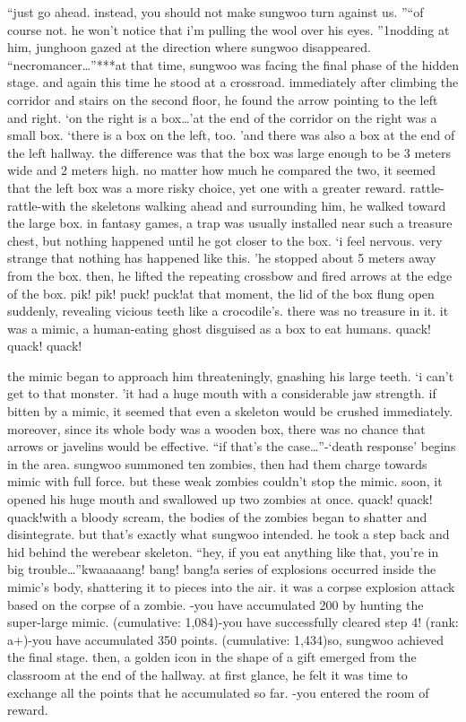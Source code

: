 “just go ahead.
 instead, you should not make sungwoo turn against us.
”“of course not.
 he won’t notice that i’m pulling the wool over his eyes.
”1nodding at him, junghoon gazed at the direction where sungwoo disappeared.
“necromancer…”***at that time, sungwoo was facing the final phase of the hidden stage.
and again this time he stood at a crossroad.
 immediately after climbing the corridor and stairs on the second floor, he found the arrow pointing to the left and right.
‘on the right is a box…’at the end of the corridor on the right was a small box.
‘there is a box on the left, too.
’and there was also a box at the end of the left hallway.
 the difference was that the box was large enough to be 3 meters wide and 2 meters high.
no matter how much he compared the two, it seemed that the left box was a more risky choice, yet one with a greater reward.
rattle- rattle-with the skeletons walking ahead and surrounding him, he walked toward the large box.
 in fantasy games, a trap was usually installed near such a treasure chest, but nothing happened until he got closer to the box.
‘i feel nervous.
 very strange that nothing has happened like this.
’he stopped about 5 meters away from the box.
 then, he lifted the repeating crossbow and fired arrows at the edge of the box.
pik! pik! puck! puck!at that moment, the lid of the box flung open suddenly, revealing vicious teeth like a crocodile’s.
there was no treasure in it.
 it was a mimic, a human-eating ghost disguised as a box to eat humans.
quack! quack! quack!

the mimic began to approach him threateningly, gnashing his large teeth.
‘i can’t get to that monster.
’it had a huge mouth with a considerable jaw strength.
if bitten by a mimic, it seemed that even a skeleton would be crushed immediately.
 moreover, since its whole body was a wooden box, there was no chance that arrows or javelins would be effective.
“if that’s the case…”-‘death response’ begins in the area.
sungwoo summoned ten zombies, then had them charge towards mimic with full force.
but these weak zombies couldn’t stop the mimic.
 soon, it opened his huge mouth and swallowed up two zombies at once.
quack! quack! quack!with a bloody scream, the bodies of the zombies began to shatter and disintegrate.
but that’s exactly what sungwoo intended.
 he took a step back and hid behind the werebear skeleton.
“hey, if you eat anything like that, you’re in big trouble…”kwaaaaang! bang! bang!a series of explosions occurred inside the mimic’s body, shattering it to pieces into the air.
it was a corpse explosion attack based on the corpse of a zombie.
-you have accumulated 200 by hunting the super-large mimic.
 (cumulative: 1,084)-you have successfully cleared step 4! (rank: a+)-you have accumulated 350 points.
 (cumulative: 1,434)so, sungwoo achieved the final stage.
 then, a golden icon in the shape of a gift emerged from the classroom at the end of the hallway.
 at first glance, he felt it was time to exchange all the points that he accumulated so far.
-you entered the room of reward.


 